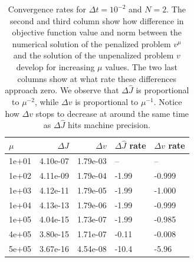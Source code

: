 \begin{table}[!h]
\centering
\caption{Convergence rates for $\Delta t=10^{-2}$ and $N=2$. The second and third column show how difference in objective function value and norm between the numerical solution of the penalized problem $v^{\mu}$ and the solution of the unpenalized problem $v$ develop for increasing $\mu$ values. The two last columns show at what rate these differences approach zero. We observe that $\Delta \hat J$ is proportional to $\mu^{-2}$, while $\Delta v$ is proportional to $\mu^{-1}$. Notice how $\Delta v$ stops to decrease at around the same time as $\Delta \hat J$ hits machine precision.}
\label{Cosn_rate_table}
\begin{tabular}{lrrll}
\toprule
{} $\mu$&  $\Delta \hat J$ &   $\Delta v$ &        $\Delta \hat J$ rate &        $\Delta v$ rate \\
\midrule
1e+01 &      4.10e-07 & 1.79e-03 &            -- &            -- \\
1e+02 &      4.11e-09 & 1.79e-04 & -1.99 & -0.999 \\
1e+03 &      4.12e-11 & 1.79e-05 & -1.99 & -1.000 \\
1e+04 &      4.13e-13 & 1.79e-06 & -1.99 & -0.999 \\
1e+05 &      4.04e-15 & 1.73e-07 & -1.99 & -0.985 \\
4e+05 &      3.80e-15 & 1.71e-07 & -0.11 & -0.008 \\
5e+05 &      3.67e-16 & 4.54e-08 & -10.4 & -5.96 \\
\bottomrule
\end{tabular}
\end{table}

